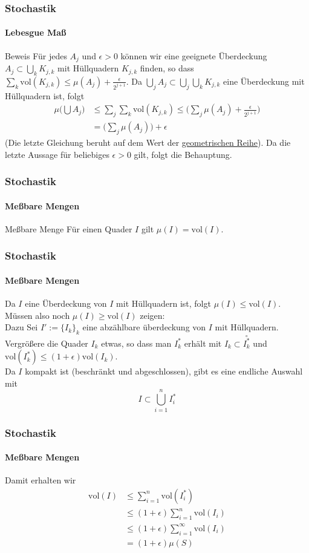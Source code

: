 \documentclass{beamer}
\begin{document}
\begin{frame}
    \frametitle{Stochastik}
\framesubtitle{Lebesgue Maß}
    \begin{block}{Beweis}
Für jedes $A_j$ und $\epsilon > 0$ können wir  eine geeignete Überdeckung  $A_j \subset \bigcup_k  K_{j,k}$ mit Hüllquadern $K_{j,k}$ finden, so dass 
 $\sum_k \text{vol} (K_{j,k}) \leq \mu(A_j) + \frac{\epsilon}{2^{j+1}}$.
Da $ \bigcup_j A_j \subset \bigcup_j \bigcup_k  K_{j,k}$ eine Überdeckung mit Hüllquadern ist, folgt
\begin{align*}
\mu \biggl (  \bigcup A_j  \biggr) & \leq \sum_j \sum_k \text{vol} (K_{j,k}) \leq  \bigl( \sum_j  \mu(A_j) + \frac{\epsilon}{2^{j+1}} \bigr)  \\
&= \bigl (\sum_j \mu(A_j) \bigr ) + \epsilon
\end{align*}
(Die letzte Gleichung beruht auf dem Wert der \href{https://de.wikipedia.org/wiki/Geometrische_Reihe}{geometrischen Reihe}).
Da die letzte Aussage für beliebiges $\epsilon > 0$ gilt, folgt die Behauptung.
\end{block}
 \end{frame}



\begin{frame}
    \frametitle{Stochastik}
\framesubtitle{Meßbare Mengen}
    \begin{block}{Meßbare Menge}
Für einen Quader $I$ gilt $\mu(I) =  \text{vol}(I) $.
\end{block}
 \end{frame}

 \begin{frame}
    \frametitle{Stochastik}
\framesubtitle{Meßbare Mengen}
Da $I$ eine Überdeckung von $I$ mit Hüllquadern ist, folgt $\mu(I) \leq \text{vol}(I)$.
\\ Müssen also noch $\mu(I) \geq \text{vol}(I)$ zeigen: \\
Dazu Sei $I' := \{ I_k \}_k$ eine abzählbare überdeckung von $I$ mit Hüllquadern.
Vergrößere die Quader $I_k$ etwas, so dass man $I_k^*$ erhält mit 
$I_k \subset \overset{\circ}{I_k^*}$ und $\text{vol}(I_k^*) \leq (1+ \epsilon)\text{vol}(I_k)$.
\\
Da $I$ kompakt ist (beschränkt und abgeschlossen), gibt es eine endliche Auswahl mit 
$$I \subset \bigcup_{i=1}^n I_i^*$$
\end{frame}


\begin{frame}
    \frametitle{Stochastik}
\framesubtitle{Meßbare Mengen}
Damit erhalten wir
\begin{align*}
    \text{vol}(I) & \leq \sum_{i=1}^n  \text{vol}(I_i^*) \\
& \leq (1 + \epsilon) \sum_{i=1}^n  \text{vol}(I_i) \\
& \leq (1 + \epsilon) \sum_{i=1}^{\infty}  \text{vol}(I_i) \\
 & = (1 + \epsilon) \mu(S)
\end{align*}

\end{frame}
\end{document}
